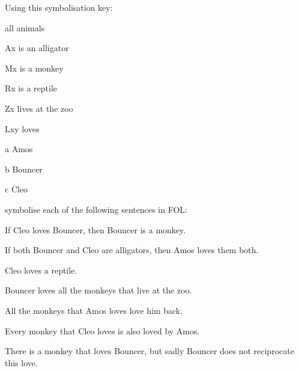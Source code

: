 \practiceproblems
\solutions
\problempart
Using this symbolisation key:
\begin{ekey}
\item[\text{domain}] all animals
\item[Ax]  is an alligator
\item[Mx]  is a monkey
\item[Rx]  is a reptile
\item[Zx]  lives at the zoo
\item[Lxy]  loves 
\item[a] Amos
\item[b] Bouncer
\item[c] Cleo
\end{ekey}
symbolise each of the following sentences in FOL:
\begin{earg}
\item If Cleo loves Bouncer, then Bouncer is a monkey. 
\item If both Bouncer and Cleo are alligators, then Amos loves them both.
\item Cleo loves a reptile.
\item Bouncer loves all the monkeys that live at the zoo.
\item All the monkeys that Amos loves love him back.
\item Every monkey that Cleo loves is also loved by Amos.
\item There is a monkey that loves Bouncer, but sadly Bouncer does not reciprocate this love.
\end{earg}

